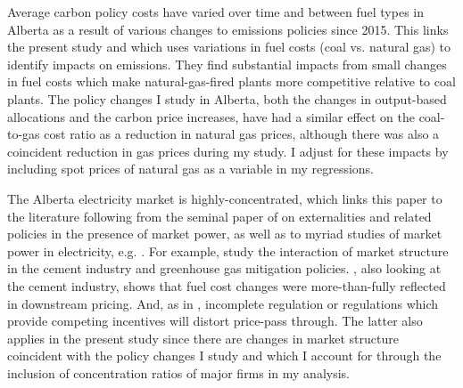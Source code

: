 \documentclass[12pt]{article}
\begin{document}
Average carbon policy costs have varied over time and between fuel types in Alberta as a result of various changes to emissions policies since 2015. This links the present study and \cite{cullen_mansur} which uses variations in fuel costs (coal vs. natural gas) to identify impacts on emissions. They find substantial impacts from small changes in fuel costs which make natural-gas-fired plants more competitive relative to coal plants. The policy changes I study in Alberta, both the changes in output-based allocations and the carbon price increases, have had a similar effect on the coal-to-gas cost ratio as a reduction in natural gas prices, although there was also a coincident reduction in gas prices during my study. I adjust for these impacts by including spot prices of natural gas as a variable in my regressions.

The Alberta electricity market is highly-concentrated, which links this paper to the literature following from the seminal paper of \cite{buchanan1969external} on externalities and related policies in the presence of market power, as well as to myriad studies of market power in electricity, e.g. \cite{borenstein_bushnell_wolak_2002}. For example, \cite{fowlie_reguant_ryan_2016} study the interaction of market structure in the cement industry and greenhouse gas mitigation policies. \cite{miller_cement}, also looking at the cement industry, shows that fuel cost changes were more-than-fully reflected in downstream pricing. And, as in \cite{holland_emissions_2012}, incomplete regulation or regulations which provide competing incentives will distort price-pass through. The latter also applies in the present study since there are changes in market structure coincident with the policy changes I study and which I account for through the inclusion of concentration ratios of major firms in my analysis. 
\end{document}
